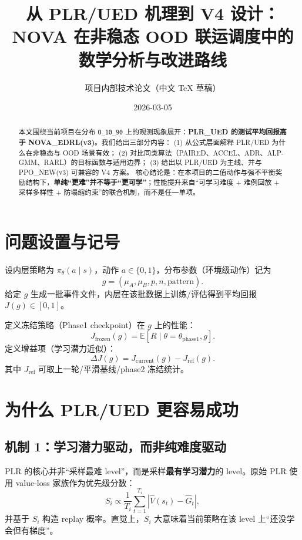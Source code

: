 \documentclass[UTF8,11pt,a4paper]{ctexart}
\title{从 PLR/UED 机理到 V4 设计：\\
NOVA 在非稳态 OOD 联运调度中的数学分析与改进路线}
\author{项目内部技术论文（中文 TeX 草稿）}
\date{2026-03-05}
\begin{document}
\maketitle

\begin{abstract}
本文围绕当前项目在分布 \texttt{O\_10\_90} 上的观测现象展开：\textbf{PLR\_UED 的测试平均回报高于 NOVA\_EDRL(v3)}。我们给出三部分内容：
(1) 从公式层面解释 PLR/UED 为什么在非稳态与 OOD 场景有效；
(2) 对比同类算法（PAIRED、ACCEL、ADR、ALP-GMM、RARL）的目标函数与适用边界；
(3) 给出以 PLR/UED 为主线、并与 PPO\_NEW(v3) 可兼容的 V4 方案。
核心结论是：在本项目的二值动作与强不平衡奖励结构下，\textbf{单纯“更难”并不等于“更可学”}；性能提升来自“可学习难度 + 难例回放 + 采样多样性 + 防塌缩约束”的联合机制，而不是任一单项。
\end{abstract}

\section{问题设置与记号}
设内层策略为 $\pi_\theta(a\mid s)$，动作 $a\in\{0,1\}$，分布参数（环境级动作）记为
\begin{equation}
 g=(\mu_A,\mu_B,p,n,\text{pattern}).
\end{equation}
给定 $g$ 生成一批事件文件，内层在该批数据上训练/评估得到平均回报 $J(g)\in[0,1]$。

定义冻结策略（Phase1 checkpoint）在 $g$ 上的性能：
\begin{equation}
J_{\mathrm{frozen}}(g)=\mathbb{E}[R\mid \theta=\theta_{\mathrm{phase1}}, g].
\end{equation}
定义增益项（学习潜力近似）：
\begin{equation}
\Delta J(g)=J_{\mathrm{current}}(g)-J_{\mathrm{ref}}(g).
\end{equation}
其中 $J_{\mathrm{ref}}$ 可取上一轮/平滑基线/phase2 冻结统计。

\section{为什么 PLR/UED 更容易成功}
\subsection{机制 1：学习潜力驱动，而非纯难度驱动}
PLR 的核心并非“采样最难 level”，而是采样\textbf{最有学习潜力}的 level。原始 PLR 使用 value-loss 家族作为优先级分数：
\begin{equation}
S_i \propto \frac{1}{T_i}\sum_{t=1}^{T_i}\left|\hat V(s_t)-\hat G_t\right|,
\end{equation}
并基于 $S_i$ 构造 replay 概率。直觉上，$S_i$ 大意味着当前策略在该 level 上“还没学会但有梯度”。
\end{document}
